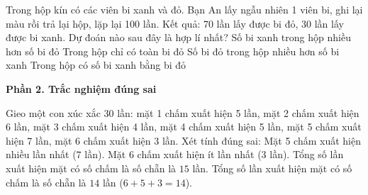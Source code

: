\begin{ex} %
Trong hộp kín có các viên bi xanh và đỏ. Bạn An lấy ngẫu nhiên 1 viên bi, ghi lại màu rồi trả lại hộp, lặp lại 100 lần. Kết quả: 70 lần lấy được bi đỏ, 30 lần lấy được bi xanh. Dự đoán nào sau đây là hợp lí nhất?
\choice
{Số bi xanh trong hộp nhiều hơn số bi đỏ}
{Trong hộp chỉ có toàn bi đỏ}
{\True Số bi đỏ trong hộp nhiều hơn số bi xanh}
{Trong hộp có số bi xanh bằng bi đỏ}
\end{ex}

\textbf{Phần 2. Trắc nghiệm đúng sai}

\begin{ex} %
Gieo một con xúc xắc 30 lần: mặt 1 chấm xuất hiện 5 lần, mặt 2 chấm xuất hiện 6 lần, mặt 3 chấm xuất hiện 4 lần, mặt 4 chấm xuất hiện 5 lần, mặt 5 chấm xuất hiện 7 lần, mặt 6 chấm xuất hiện 3 lần. Xét tính đúng sai:
\choiceTF
{\True Mặt 5 chấm xuất hiện nhiều lần nhất ($7$ lần).}
{\True Mặt 6 chấm xuất hiện ít lần nhất ($3$ lần).}
{Tổng số lần xuất hiện mặt có số chấm là số chẵn là $15$ lần.}
{\True Tổng số lần xuất hiện mặt có số chấm là số chẵn là $14$ lần ($6 + 5 + 3 = 14$).}
\end{ex}

